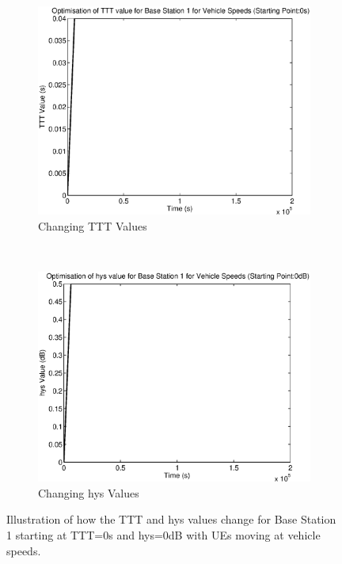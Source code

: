 \begin{figure}[H]
        \centering
        \begin{subfigure}[b]{0.49\textwidth}
                \includegraphics[width=\textwidth]{figures/graphs/vehlow/TTT1.eps}
                \caption{Changing TTT Values}
        \end{subfigure}%
        ~ %
        \begin{subfigure}[b]{0.49\textwidth}
                \includegraphics[width=\textwidth]{figures/graphs/vehlow/hys1.eps}
                \caption{Changing hys Values}
        \end{subfigure}
        \caption{Illustration of how the TTT and hys values change for Base Station 1 starting at TTT=0s and hys=0dB with UEs moving at vehicle speeds.}
\end{figure}
